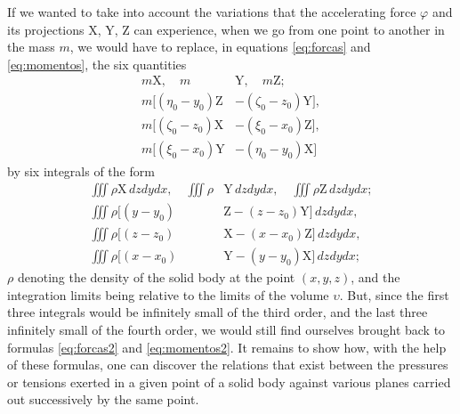 \documentclass[leqno,openright,smallroyalvopaper,8pt,twoside,showtrims]{memoir}
\begin{document}
 If we wanted to take into account the variations that the accelerating force $\varphi$ and its projections X, Y, Z can experience, when we go from one point to another in the mass $m$, we would have to replace, in equations \eqref{eq:forcas} and \eqref{eq:momentos}, the six quantities
\begin{align*}
m\text{X},\quad m&\text{Y},\quad m\text{Z};\\[5pt]
m[(\eta_0-y_0)\text{Z}&-(\zeta_0-z_0)\text{Y}],\\
m[(\zeta_0-z_0)\text{X}&-(\xi_0-x_0)\text{Z}],\\
m[(\xi_0-x_0)\text{Y}&-(\eta_0-y_0)\text{X}]
\end{align*}
by six integrals of the form
\begin{align*}
\textstyle\iiint \rho \text{X}\,dzdydx,\quad \textstyle\iiint \rho &\text{Y}\,dzdydx,\quad \textstyle\iiint \rho \text{Z}\,dzdydx;\\[5pt]
\textstyle\iiint\rho[(y-y_0)&\text{Z}-(z-z_0)\text{Y}]\,dzdydx,\\
\textstyle\iiint\rho[(z-z_0)&\text{X}-(x-x_0)\text{Z}]\,dzdydx,\\
\textstyle\iiint\rho[(x-x_0)&\text{Y}-(y-y_0)\text{X}]\,dzdydx;
\end{align*}
$\rho$ denoting the density of the solid body at the point $(x, y, z)$, and the integration limits being relative to the limits of the volume $\upsilon$. But, since the first three integrals would be infinitely small of the third order, and the last three infinitely small of the fourth order, we would still find ourselves brought back to formulas \eqref{eq:forcas2} and \eqref{eq:momentos2}. It remains to show how, with the help of these formulas, one can discover the relations that exist between the pressures or tensions exerted in a given point of a solid body against various planes carried out successively by the same point.
\end{document}
